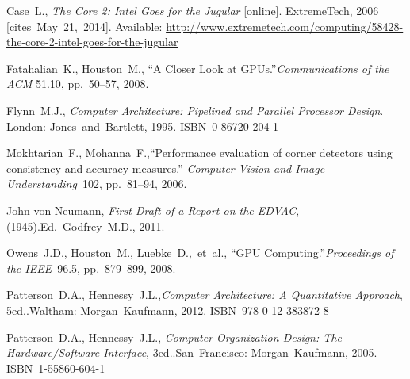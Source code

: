 {\raggedright
	\begin{thebibliography}{99}
		
			Case~L.,
			\textit{The Core 2: Intel Goes for the Jugular} [online].
			ExtremeTech, 2006 [cites~May~21,~2014].
			Available: \url{http://www.extremetech.com/computing/58428-the-core-2-intel-goes-for-the-jugular}
		
			Fatahalian~K., Houston~M.,
			``A Closer Look at GPUs.''\linebreak[1]
			\textit{Communications of the ACM} 51.10, pp.~50--57, 2008.
		
			Flynn~M.J.,
			\textit{Computer Architecture: Pipelined and Parallel Processor Design}.
			\linebreak[3]
			London: Jones~and~Bartlett, 1995. ISBN~0-86720-204-1
		
			Mokhtarian~F., Mohanna~F.,\linebreak[1]
			``Performance evaluation of corner detectors using
			consistency and accuracy measures.''
			\textit{Computer Vision and Image Understanding}~102, pp.~81--94, 2006.
		
			John von Neumann,
			\textit{First Draft of a Report on the EDVAC}, (1945).\linebreak[2]
			Ed.~Godfrey~M.D., 2011.
		
			Owens~J.D., Houston~M., Luebke~D.,~et~al.,
			``GPU Computing.''\linebreak[1]
			\textit{Proceedings of the IEEE}~96.5, pp.~879--899,
			2008.
		
			Patterson~D.A., Hennessy~J.L.,\linebreak[1]
			\textit{Computer Architecture: A Quantitative Approach},
				5\nth ed..\linebreak[1]
			Waltham: Morgan~Kaufmann, 2012. ISBN~978-0-12-383872-8
		
			Patterson~D.A., Hennessy~J.L., \linebreak[1]
			\textit{Computer Organization Design: %
				The Hardware/Software Interface}, 3\rd ed..\linebreak[1]
			San~Francisco: Morgan~Kaufmann, 2005. ISBN~1-55860-604-1
		

\end{thebibliography}}
